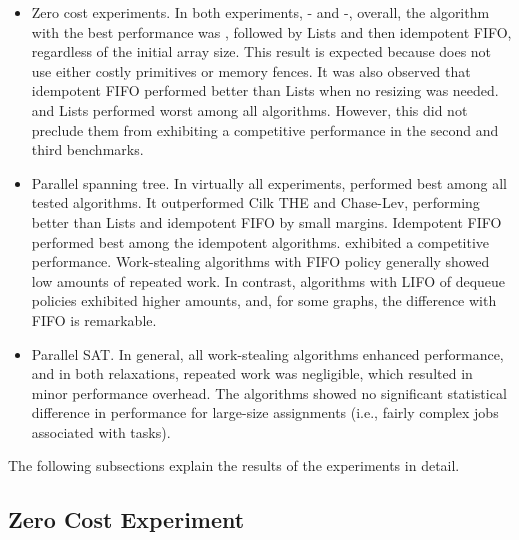 \begin{itemize}
\item Zero cost experiments. In both experiments, \Puts{}-\Takes{} and \Puts-\Steals{}, overall, the algorithm with the best performance was \NCWSM, followed by \NCWSM Lists and then idempotent FIFO, regardless of the initial array size. This result is expected because \NCWSM does not use either costly primitives or memory fences. It was also observed that idempotent FIFO performed better than \NCWSM Lists when no resizing was needed. \BNCWSM and \BNCWSM Lists performed worst among all algorithms. However, this did not preclude them from exhibiting a competitive performance in the second and third benchmarks.

\item Parallel spanning tree. In virtually all experiments, \NCWSM performed best among all tested algorithms. It outperformed Cilk THE and Chase-Lev, performing better than \NCWSM Lists and idempotent FIFO by small margins. Idempotent FIFO performed best among the idempotent algorithms.  \BNCWSM exhibited a competitive performance. Work-stealing algorithms with FIFO policy generally showed low amounts of repeated work. In contrast, algorithms with LIFO of dequeue policies exhibited higher amounts, and, for some graphs, the difference with FIFO is remarkable.

\item Parallel SAT. In general, all work-stealing algorithms enhanced performance, and in both relaxations, repeated work was negligible, which resulted in minor performance overhead. The algorithms showed no significant statistical difference in performance for large-size assignments (i.e., fairly complex jobs associated with tasks).

\end{itemize}

The following subsections explain the results of the experiments in detail.

\subsection{Zero Cost Experiment}


